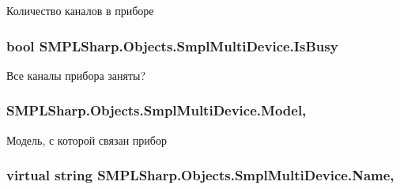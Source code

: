 Количество каналов в приборе 

\hypertarget{class_s_m_p_l_sharp_1_1_objects_1_1_smpl_multi_device_a20702c1214e518d92f2f9e2e8c66550e}{
\subsubsection[{Is\-Busy}]{\setlength{\rightskip}{0pt plus 5cm}bool S\-M\-P\-L\-Sharp.\-Objects.\-Smpl\-Multi\-Device.\-Is\-Busy\hspace{0.3cm}{\ttfamily [get]}}}\label{d8/d23/class_s_m_p_l_sharp_1_1_objects_1_1_smpl_multi_device_a20702c1214e518d92f2f9e2e8c66550e}


Все каналы прибора заняты? 

\hypertarget{class_s_m_p_l_sharp_1_1_objects_1_1_smpl_multi_device_aa5f9548873f61a77d0eda3d1a94b555d}{
\subsubsection[{Model}]{ S\-M\-P\-L\-Sharp.\-Objects.\-Smpl\-Multi\-Device.\-Model\hspace{0.3cm}{\ttfamily [get]}, {\ttfamily [set]}}}\label{d8/d23/class_s_m_p_l_sharp_1_1_objects_1_1_smpl_multi_device_aa5f9548873f61a77d0eda3d1a94b555d}


Модель, с которой связан прибор 

\hypertarget{class_s_m_p_l_sharp_1_1_objects_1_1_smpl_multi_device_a8120bc9019cef69077019bc59c0acfa6}{
\subsubsection[{Name}]{\setlength{\rightskip}{0pt plus 5cm}virtual string S\-M\-P\-L\-Sharp.\-Objects.\-Smpl\-Multi\-Device.\-Name\hspace{0.3cm}{\ttfamily [get]}, {\ttfamily [set]}}}\label{d8/d23/class_s_m_p_l_sharp_1_1_objects_1_1_smpl_multi_device_a8120bc9019cef69077019bc59c0acfa6}



